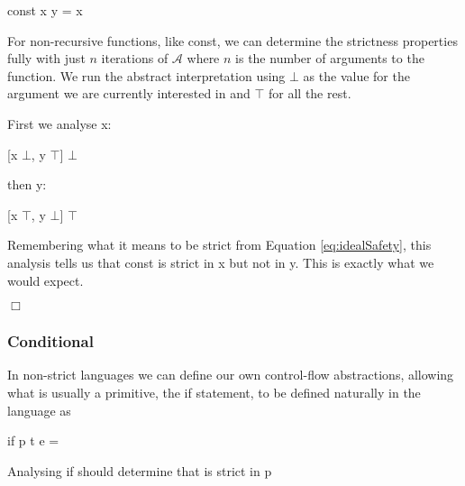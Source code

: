 \begin{haskell*}
const x y = x
\end{haskell*}

For non-recursive functions, like \<const\>, we can determine the strictness
properties fully with just $n$ iterations of $\mathcal{A}$ where $n$ is the
number of arguments to the function. We run the abstract interpretation using
$\bot$ as the value for the argument we are currently interested in and $\top$
for all the rest.

First we analyse \<x\>:
\begin{haskell*}
[x \mapsto \(\bot\), y \mapsto \(\top\)] \Rightarrow \(\bot\)
\end{haskell*}

then \<y\>:
\begin{haskell*}
[x \mapsto \(\top\), y \mapsto \(\bot\)] \Rightarrow \(\top\)
\end{haskell*}

Remembering what it means to be strict from Equation \ref{eq:idealSafety}, this
analysis tells us that \<const\> is strict in \<x\> but not in \<y\>. This is
exactly what we would expect.

\hfill$\Box$

\subsubsection{Conditional}

In non-strict languages we can define our own control-flow abstractions,
allowing what is usually a primitive, the \<if\> statement, to be defined
naturally in the language as

\begin{haskell*}
if p t e = 
\end{haskell*}

Analysing \<if\> should determine that is strict in \<p\>

\begin{haskell*}
 \hasphi
{}
\end{haskell*}


